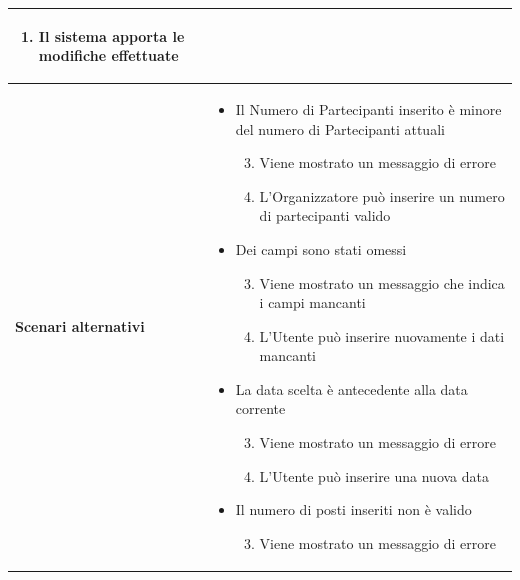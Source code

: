 \documentclass[12pt,a4paper]{report}
\begin{document}
\begin{tabularx}{\textwidth}{|p{3.8cm}|X|}
\begin{enumerate}[nosep, leftmargin=*, before={\vspace{-0.5\baselineskip}}, after={\vspace{-0.8\baselineskip}}]
\begin{enumerate}[nosep, leftmargin=*]
\begin{itemize}[nosep, leftmargin=*]
                \end{itemize}
                \item Eliminare l'Evento
            \end{enumerate}
            \item Il sistema apporta le modifiche effettuate
        \end{enumerate} \\ \hline
    \textbf{Scenari alternativi} & 
        \begin{itemize}[nosep, leftmargin=*, before={\vspace{-0.5\baselineskip}}, after={\vspace{-0.8\baselineskip}}]
            \item Il Numero di Partecipanti inserito è minore del numero di Partecipanti attuali
            \begin{enumerate}[nosep, leftmargin=*]
                \setcounter{enumi}{2}
                \item Viene mostrato un messaggio di errore
                \item L'Organizzatore può inserire un numero di partecipanti valido
            \end{enumerate}
            \item Dei campi sono stati omessi
            \begin{enumerate}[nosep, leftmargin=*]
                \setcounter{enumi}{2}
                \item Viene mostrato un messaggio che indica i campi mancanti
                \item L'Utente può inserire nuovamente i dati mancanti
            \end{enumerate}
            \item La data scelta è antecedente alla data corrente
            \begin{enumerate}[nosep, leftmargin=*]
                \setcounter{enumi}{2}
                \item Viene mostrato un messaggio di errore
                \item L'Utente può inserire una nuova data
            \end{enumerate}
            \item Il numero di posti inseriti non è valido
            \begin{enumerate}[nosep, leftmargin=*]
                \setcounter{enumi}{2}
                \item Viene mostrato un messaggio di errore

\end{enumerate}
\end{itemize}
\end{tabularx}
\end{document}
